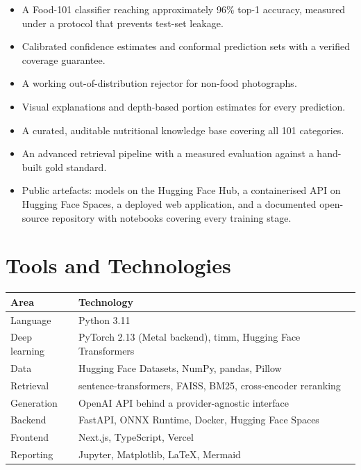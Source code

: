 \documentclass[12pt,a4paper,oneside]{report}
\begin{document}
\begin{itemize}
  \item A Food-101 classifier reaching approximately 96\% top-1 accuracy,
  measured under a protocol that prevents test-set leakage.
  \item Calibrated confidence estimates and conformal prediction sets with a
  verified coverage guarantee.
  \item A working out-of-distribution rejector for non-food photographs.
  \item Visual explanations and depth-based portion estimates for every
  prediction.
  \item A curated, auditable nutritional knowledge base covering all 101
  categories.
  \item An advanced retrieval pipeline with a measured evaluation against a
  hand-built gold standard.
  \item Public artefacts: models on the Hugging Face Hub, a containerised API on
  Hugging Face Spaces, a deployed web application, and a documented open-source
  repository with notebooks covering every training stage.
\end{itemize}

\chapter{Tools and Technologies}

\begin{table}[h]
\centering
\begin{tabular}{p{3.6cm}p{9.8cm}}
\toprule
\textbf{Area} & \textbf{Technology} \\
\midrule
Language & Python 3.11 \\
Deep learning & PyTorch 2.13 (Metal backend), timm, Hugging Face Transformers \\
Data & Hugging Face Datasets, NumPy, pandas, Pillow \\
Retrieval & sentence-transformers, FAISS, BM25, cross-encoder reranking \\
Generation & OpenAI API behind a provider-agnostic interface \\
Backend & FastAPI, ONNX Runtime, Docker, Hugging Face Spaces \\
Frontend & Next.js, TypeScript, Vercel \\
Reporting & Jupyter, Matplotlib, \LaTeX, Mermaid \\
\bottomrule
\end{tabular}
\end{table}
\end{document}
